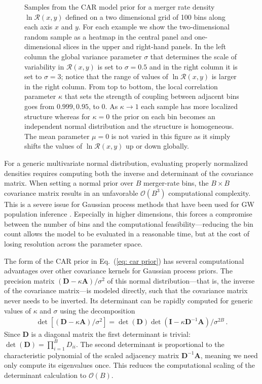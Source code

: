 \begin{refsection}
\begin{figure}
\caption{
Samples from the CAR model prior for a merger rate density $\ln\mathcal{R}(x,y)$ defined on a two dimensional grid of 100 bins along each axis $x$ and $y$. For each example we show the two-dimensional random sample as a heatmap in the central panel and one-dimensional slices in the upper and right-hand panels. In the left column the global variance parameter $\sigma$ that determines the scale of variability in $\mathcal{R}(x,y)$ is set to $\sigma=0.5$ and in the right column it is set to $\sigma=3$; notice that the range of values of $\ln\mathcal{R}(x,y)$ is larger in the right column. From top to bottom, the local correlation parameter $\kappa$ that sets the strength of coupling between adjacent bins goes from $0.999, 0.95$, to $0$. As $\kappa\to1$ each sample has more localized structure whereas for $\kappa=0$ the prior on each bin becomes an independent normal distribution and the structure is homogeneous. The mean parameter $\mu=0$ is not varied in this figure as it simply shifts the values of $\ln\mathcal{R}(x,y)$ up or down globally.
}
\label{fig: car prior samples}
\end{figure}

For a generic multivariate normal distribution, evaluating properly normalized densities requires computing both the inverse and determinant of the covariance matrix. When setting a normal prior over $B$ merger-rate bins, the $B \times B$ covariance matrix results in an unfavorable $\mathcal{O}(B^3)$ computational complexity. This is a severe issue for Gaussian process methods that have been used for GW population inference \cite{KAGRA:2021duu, Mandel:2016prl, Vitale:2018yhm, Ng:2020qpk, Ng:2022agi, Ray:2023upk, MaganaHernandez:2024uty, Ray:2024hos, Farah:2024xub, Li:2021ukd}. Especially in higher dimensions, this forces a compromise between the number of bins and the computational feasibility---reducing the bin count allows the model to be evaluated in a reasonable time, but at the cost of losing resolution across the parameter space. 

The form of the CAR prior in Eq.~(\ref{eq: car prior}) has several computational advantages over other covariance kernels for Gaussian process priors. The precision matrix $(\mathbf{D} - \kappa \mathbf{A}) / \sigma^2$ of this normal distribution---that is, the inverse of the covariance matrix---is modeled directly, such that the covariance matrix never needs to be inverted. Its determinant can be rapidly computed for generic values of $\kappa$ and $\sigma$ using the decomposition
\begin{align}
\det [ ( \mathbf{D} - \kappa \mathbf{A} ) / \sigma^2 ]
=
\det ( \mathbf{D} ) \det ( \mathbf{I} - \kappa \mathbf{D}^{-1} \mathbf{A} ) / \sigma^{2B}
\, .
\end{align}
Since $\mathbf{D}$ is a diagonal matrix the first determinant is trivial: $\det(\mathbf{D}) = \prod_{i=1}^B D_{ii}$. The second determinant is proportional to the characteristic polynomial of the scaled adjacency matrix $\mathbf{D}^{-1}\mathbf{A}$, meaning we need only compute its eigenvalues once. This reduces the computational scaling of the determinant calculation to $\mathcal{O}(B)$.


\end{refsection}
